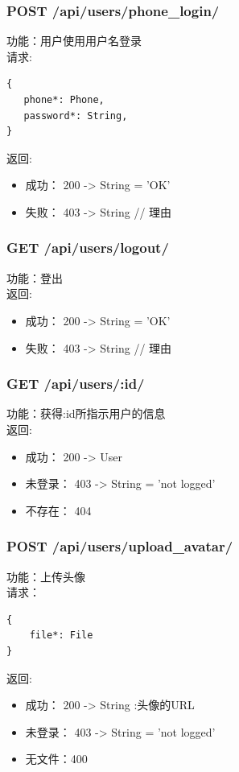 \subsubsection{POST /api/users/phone\_login/}

\noindent
功能：用户使用用户名登录\\
请求:
\begin{lstlisting}[numbers=none, frame=none]
{
   phone*: Phone,
   password*: String,
}
\end{lstlisting}
返回:
\begin{itemize}
	\item 成功： 200 -> String = 'OK'
	\item 失败： 403 -> String // 理由
\end{itemize}

\subsubsection{GET /api/users/logout/}

\noindent
功能：登出\\
返回:
\begin{itemize}
	\item 成功： 200 -> String = 'OK'
	\item 失败： 403 -> String // 理由
\end{itemize}


\subsubsection{GET /api/users/:id/}

\noindent
功能：获得:id所指示用户的信息\\
返回:
\begin{itemize}
	\item 成功： 200 -> User
	\item 未登录： 403 -> String = 'not logged'
	\item 不存在： 404
\end{itemize}



\subsubsection{POST /api/users/upload\_avatar/}

\noindent
功能：上传头像\\
请求：
\begin{lstlisting}[numbers=none, frame=none]
{
    file*: File
}
\end{lstlisting}
返回:
\begin{itemize}
	\item 成功： 200 -> String :头像的URL
	\item 未登录： 403 -> String = 'not logged'
	\item 无文件：400
\end{itemize}


